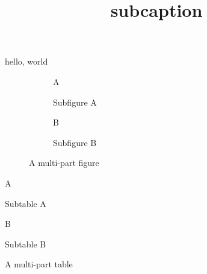 \documentclass{amsart}
\title{subcaption}
\begin{document}
\maketitle

hello, world

\begin{figure}[h]

\begin{subfigure}[b]{.5\linewidth}
\centering\large A
\caption{Subfigure A}
\end{subfigure}

\begin{subfigure}[b]{.5\linewidth}
\centering\large B
\caption{Subfigure B}
\end{subfigure}

\caption{A multi-part figure}

\end{figure}

\begin{table}[h]

\begin{subtable}[b]{.5\linewidth}
\centering\large A
\caption{Subtable A}
\end{subtable}

\begin{subtable}[b]{.5\linewidth}
\centering\large B
\caption{Subtable B}
\end{subtable}

\caption{A multi-part table}

\end{table}
\end{document}
